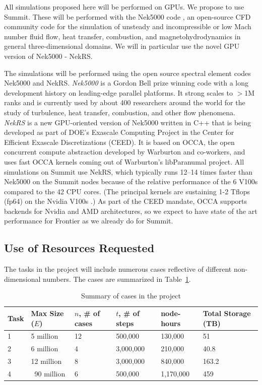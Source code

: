 All simulations proposed here will be performed on GPUs. We propose to use
Summit.  These will be performed with the Nek5000 code
\cite{argonne:nekdoc}, an open-source CFD  community code for the simulation of
unsteady and incompressible or low Mach number fluid flow, heat transfer,
combustion, and magnetohydrodynamics in general three-dimensional domains. We
will in particular use the novel GPU version of Nek5000 - NekRS.

The simulations will be performed using the open source spectral element codes
Nek5000 and NekRS.   {\em Nek5000} is a Gordon Bell prize winning code with a
long development history on leading-edge parallel platforms.  It strong scales
to $>$1M ranks \cite{fischer15} and is currently used by about 400 researchers
around the world for the study of turbulence, heat transfer, combustion, and
other flow phenomena.  {\em NekRS} is a new GPU-oriented version of Nek5000
written in C++ that is being developed as part of DOE's Exascale Computing
Project in the Center for Efficient Exascale Discretizations (CEED).  It is
based on OCCA, the open concurrent compute abstraction developed by Warburton
and co-workers, and uses fast OCCA kernels coming out of Warburton's
libParanumal project.  All simulations on Summit use NekRS, which typically
runs 12--14 times faster than Nek5000 on the Summit nodes because of the
relative performance of the 6 V100s compared to the 42 CPU cores.  (The
principal kernels are sustaining 1-2 Tflops (fp64) on the Nvidia V100s
\cite{fischer20a,warburton2019}.) As part of the CEED mandate, OCCA supports
backends for Nvidia and AMD architectures, so we expect to have state of the
art performance for Frontier as we already do for Summit.

\vspace{-.25in}
\subsection{Use of Resources Requested}
\vspace{-.2in}

The tasks in the project will include numerous cases reflective of different
non-dimensional numbers. The cases are summarized in Table~\ref{tab:cases}.

\begin{table}
\centering
\caption{Summary of cases in the project}
\begin{tabular}{llllll}
\hline
\hline
Task & Max Size ($E$) &  $n$, \# of cases  & $t$, \# of steps & node-hours & Total Storage (TB)\\
\hline
\hline
1 & 5 million       & 12   & 500,000   &    130,000 & 51\\
2 & 6 million       & 4    & 3,000,000 &    210,000 & 40.8\\
3 & 12 million      & 8    & 3,000,000 &    840,000 & 163.2\\
4 & ~90 million  & 6    & 500,000   &  1,170,000 & 459\\
\hline
\hline
\end{tabular}
\label{tab:cases}
\end{table}

